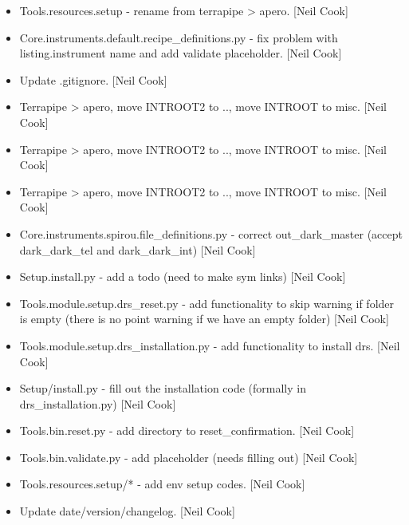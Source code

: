 \documentclass[a4paper,10pt,english]{report}
\begin{document}
\begin{itemize}
\item {} 
Tools.resources.setup - rename from terrapipe \textendash{}\textgreater{} apero. {[}Neil Cook{]}

\item {} 
Core.instruments.default.recipe\_definitions.py - fix problem with
listing.instrument name and add validate placeholder. {[}Neil Cook{]}

\item {} 
Update .gitignore. {[}Neil Cook{]}

\item {} 
Terrapipe \textendash{}\textgreater{} apero, move INTROOT2 to .., move INTROOT to misc. {[}Neil
Cook{]}

\item {} 
Terrapipe \textendash{}\textgreater{} apero, move INTROOT2 to .., move INTROOT to misc. {[}Neil
Cook{]}

\item {} 
Terrapipe \textendash{}\textgreater{} apero, move INTROOT2 to .., move INTROOT to misc. {[}Neil
Cook{]}

\item {} 
Core.instruments.spirou.file\_definitions.py - correct out\_dark\_master
(accept dark\_dark\_tel and dark\_dark\_int) {[}Neil Cook{]}

\item {} 
Setup.install.py - add a todo (need to make sym links) {[}Neil Cook{]}

\item {} 
Tools.module.setup.drs\_reset.py - add functionality to skip warning if
folder is empty (there is no point warning if we have an empty folder)
{[}Neil Cook{]}

\item {} 
Tools.module.setup.drs\_installation.py - add functionality to install
drs. {[}Neil Cook{]}

\item {} 
Setup/install.py - fill out the installation code (formally in
drs\_installation.py) {[}Neil Cook{]}

\item {} 
Tools.bin.reset.py - add directory to reset\_confirmation. {[}Neil Cook{]}

\item {} 
Tools.bin.validate.py - add placeholder (needs filling out) {[}Neil
Cook{]}

\item {} 
Tools.resources.setup/* - add env setup codes. {[}Neil Cook{]}

\item {} 
Update date/version/changelog. {[}Neil Cook{]}

\end{itemize}
\end{document}
